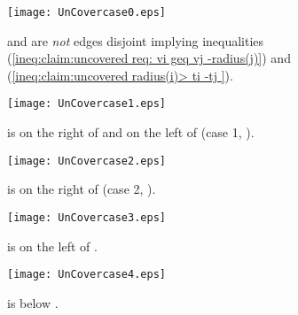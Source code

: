 \documentclass[11pt]{article}
\begin{document}
\begin{figure}
\begin{center}
\texttt{[image: UnCovercase0.eps]}
\end{center}
\caption{\sf
 and  are {\em not} edges disjoint implying inequalities
(\ref{ineq:claim:uncovered req: vi geq vj -radius(j)}) and (\ref{ineq:claim:uncovered radius(i)> ti -tj }).
\label{fig:UnCovercase0}
}
\end{figure}
\begin{figure}[ht]
\begin{center}
\texttt{[image: UnCovercase1.eps]}
\end{center}
\caption{\sf
\label{fig:UnCovercase1}
 is on the right of  and on the left of  (case 1, ).
}
\end{figure}
\begin{figure}[ht]
\begin{center}
\texttt{[image: UnCovercase2.eps]}
\end{center}
\caption{\sf
\label{fig:UnCovercase2}
 is on the right of  (case 2, ).
}
\end{figure}
\begin{figure}
\begin{center}
\texttt{[image: UnCovercase3.eps]}
\end{center}
\caption{\sf
\label{fig:UnCovercase3}
 is on the left of .
}
\end{figure}
\begin{figure}[ht]
\begin{center}
\texttt{[image: UnCovercase4.eps]}
\end{center}
\caption{\sf
\label{fig:UnCovercase4}
 is below .
}
\end{figure}
\end{document}
